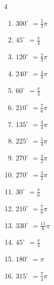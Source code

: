 \begin{multicols}{4}
\begin{enumerate}
  \item $\displaystyle 300^{\circ}$
        $\displaystyle =\frac{5}{3}\pi$

  \item $\displaystyle 45^{\circ}$
        $\displaystyle =\frac{\pi}{4}$

  \item $\displaystyle 120^{\circ}$
        $\displaystyle =\frac{2}{3}\pi$

  \item $\displaystyle 240^{\circ}$
        $\displaystyle =\frac{4}{3}\pi$

  \item $\displaystyle 60^{\circ}$
        $\displaystyle =\frac{\pi}{3}$

  \item $\displaystyle 210^{\circ}$
        $\displaystyle =\frac{7}{6}\pi$

  \item $\displaystyle 135^{\circ}$
        $\displaystyle =\frac{3}{4}\pi$

  \item $\displaystyle 225^{\circ}$
        $\displaystyle =\frac{5}{4}\pi$

  \item $\displaystyle 270^{\circ}$
        $\displaystyle =\frac{3}{2}\pi$

  \item $\displaystyle 270^{\circ}$
        $\displaystyle =\frac{3}{2}\pi$

\columnbreak %

\resetques

  \item $\displaystyle 30^{\circ}$
        $\displaystyle =\frac{\pi}{6}$

  \item $\displaystyle 210^{\circ}$
        $\displaystyle =\frac{7}{6}\pi$

  \item $\displaystyle 330^{\circ}$
        $\displaystyle =\frac{11}{6}\pi$

  \item $\displaystyle 45^{\circ}$
        $\displaystyle =\frac{\pi}{4}$

  \item $\displaystyle 180^{\circ}$
        $\displaystyle =\pi$

  \item $\displaystyle 315^{\circ}$
        $\displaystyle =\frac{7}{4}\pi$


\end{enumerate}
\end{multicols}
